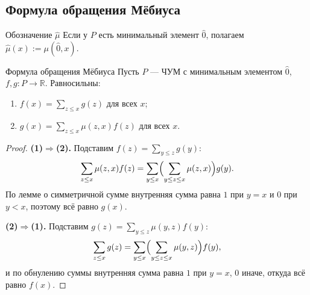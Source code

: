 \subsection{Формула обращения Мёбиуса}

\begin{Definition}{Обозначение $\hat\mu$}{}
	Если у $P$ есть минимальный элемент $\hat 0$, полагаем $\hat\mu(x):=\mu(\hat 0,x)$.
\end{Definition}

\begin{Theorem}{Формула обращения Мёбиуса}{}
	Пусть $P$ — ЧУМ с минимальным элементом $\hat 0$, $f,g\colon P\to\mathbb R$. Равносильны:
	\begin{enumerate}
		\item $f(x)=\displaystyle\sum_{z\le x}g(z)$ для всех $x$;
		\item $g(x)=\displaystyle\sum_{z\le x}\mu(z,x)f(z)$ для всех $x$.
	\end{enumerate}
\end{Theorem}

\begin{proof}
	\textbf{(1)$\Rightarrow$(2).} Подставим $f(z)=\sum_{y\le z}g(y)$:
	\[
	\sum_{z\le x}\mu(z,x)f(z)=\sum_{y\le x}\Bigl(\sum_{y\le z\le x}\mu(z,x)\Bigr)g(y).
	\]
	По лемме о симметричной сумме внутренняя сумма равна $1$ при $y=x$ и $0$ при $y<x$, поэтому всё равно $g(x)$.

	\textbf{(2)$\Rightarrow$(1).} Подставим $g(z)=\sum_{y\le z}\mu(y,z)f(y)$:
	\[
	\sum_{z\le x}g(z)=\sum_{y\le x}\Bigl(\sum_{y\le z\le x}\mu(y,z)\Bigr)f(y),
	\]
	и по обнулению суммы внутренняя сумма равна $1$ при $y=x$, $0$ иначе, откуда всё равно $f(x)$.
\end{proof}
